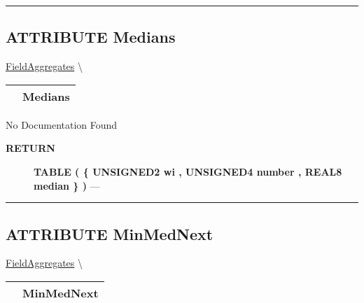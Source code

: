 \rule{\linewidth}{0.5pt}
\subsection*{\textsf{\colorbox{headtoc}{\color{white} ATTRIBUTE}
Medians}}

\hypertarget{ecldoc:ml_core.fieldaggregates.medians}{}
\hspace{0pt} \hyperlink{ecldoc:ml_core.fieldaggregates}{FieldAggregates} \textbackslash 

{\renewcommand{\arraystretch}{1.5}
\begin{tabularx}{\textwidth}{|>{\raggedright\arraybackslash}l|X|}
\hline
\hspace{0pt}\mytexttt{\color{red} } & \textbf{Medians} \\
\hline
\end{tabularx}
}

\par





No Documentation Found








\par
\begin{description}
\item [\colorbox{tagtype}{\color{white} \textbf{\textsf{RETURN}}}] \textbf{TABLE ( \{ UNSIGNED2 wi , UNSIGNED4 number , REAL8 median \} )} --- 
\end{description}




\rule{\linewidth}{0.5pt}
\subsection*{\textsf{\colorbox{headtoc}{\color{white} ATTRIBUTE}
MinMedNext}}

\hypertarget{ecldoc:ml_core.fieldaggregates.minmednext}{}
\hspace{0pt} \hyperlink{ecldoc:ml_core.fieldaggregates}{FieldAggregates} \textbackslash 

{\renewcommand{\arraystretch}{1.5}
\begin{tabularx}{\textwidth}{|>{\raggedright\arraybackslash}l|X|}
\hline
\hspace{0pt}\mytexttt{\color{red} } & \textbf{MinMedNext} \\
\hline
\end{tabularx}
}


